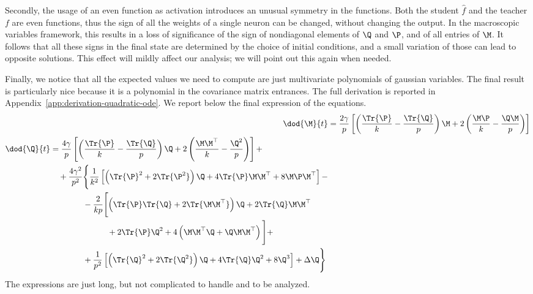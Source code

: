 Secondly, the usage of an even function as activation introduces an unusual symmetry in 
the functions. Both the student \(\hat{f}\) and the teacher \(f\) are even functions,
thus the sign of all the weights of a single neuron can be changed, without changing 
the output. In the macroscopic variables framework, this results in a loss of significance
of the sign of nondiagonal elements of \(\Q\) and \(\P\), and of all entries of \(\M\).
It follows that all these signs in the final state are determined by the choice of initial
conditions, and a small variation of those can lead to opposite solutions. This effect 
will mildly affect our analysis; we will point out this again when needed.

Finally, we notice that all the expected values we need to compute are just multivariate
polynomials of gaussian variables. The final result is particularly nice
because it is a polynomial in the covariance matrix entrances. The full derivation
is reported in Appendix~\ref{app:derivation-quadratic-ode}.
We report below the final expression of the equations.
\begin{subequations} \label{eq:quadraticODEs}\begin{align}
    \label{eq:quadraticODE_M}
    \dod{\M}{t} &= \frac{2 \gamma}{p}\left[
        \left(\frac{\Tr{\P}}k - \frac{\Tr{\Q}}p\right)\M +
        2\left(\frac{\M\P}{k} - \frac{\Q\M}{p}\right)
    \right] \\
    \label{eq:quadraticODE_Q}
    \begin{split}
        \dod{\Q}{t} &= \frac{4 \gamma}{p}\left[
            \left(\frac{\Tr{\P}}k - \frac{\Tr{\Q}}p\right)\Q +
            2\left(\frac{\M\M^\top}{k} - \frac{\Q^2}{p}\right)
        \right] +\\
        &\quad+\frac{4 \gamma^2}{p^2} \Biggr\{
            \frac1{k^2}\left[\left(\Tr{\P}^2+2\Tr{\P^2}\right)\Q +
                            4\Tr{\P}\M\M^\top + 8\M\P\M^\top
                    \right] - \\
            &\qquad\quad\quad
            -\frac2{kp}\Biggl[\left(\Tr{\P}\Tr{\Q}+2\Tr{\M\M^\top}\right)\Q +
                            2\Tr{\Q}\M\M^\top\\
                            &\qquad\qquad\qquad\quad+ 2\Tr{\P}\Q^2+ 
                            4\left(\M\M^\top\Q + \Q\M\M^\top\right)
                        \Biggl] + \\
            &\qquad\quad\quad
            +\frac1{p^2}\left[\left(\Tr{\Q}^2+2\Tr{\Q^2}\right)\Q +
                            4\Tr{\Q}\Q^2 + 8\Q^3
                        \right] + \Delta \Q\Biggr\}
    \end{split}
\end{align}\end{subequations}
The expressions are just long, but not complicated to handle and to be analyzed.

